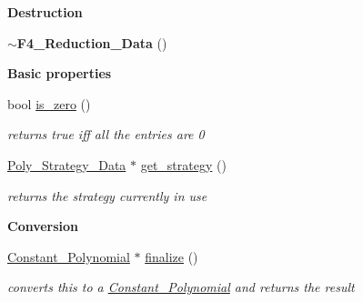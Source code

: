 \begin{Indent}\textbf{ Destruction}\par
\begin{DoxyCompactItemize}
\item 
\mbox{\label{class_f4___reduction___data_a6806b4da4f0bc2753ba5a775794f9165}} 
{\bfseries $\sim$\+F4\+\_\+\+Reduction\+\_\+\+Data} ()
\end{DoxyCompactItemize}
\end{Indent}
\begin{Indent}\textbf{ Basic properties}\par
\begin{DoxyCompactItemize}
\item 
\mbox{\label{class_f4___reduction___data_aee8c1358071a26e60b2e50f9678dcfb0}} 
bool \hyperlink{class_f4___reduction___data_aee8c1358071a26e60b2e50f9678dcfb0}{is\+\_\+zero} ()
\begin{DoxyCompactList}\small\item\em returns {\ttfamily true} iff all the entries are 0 \end{DoxyCompactList}\item 
\mbox{\label{class_f4___reduction___data_ab144b6e1a710fc979d906a8938cae7cf}} 
\hyperlink{class_poly___strategy___data}{Poly\+\_\+\+Strategy\+\_\+\+Data} $\ast$ \hyperlink{class_f4___reduction___data_ab144b6e1a710fc979d906a8938cae7cf}{get\+\_\+strategy} ()
\begin{DoxyCompactList}\small\item\em returns the strategy currently in use \end{DoxyCompactList}\end{DoxyCompactItemize}
\end{Indent}
\begin{Indent}\textbf{ Conversion}\par
\begin{DoxyCompactItemize}
\item 
\mbox{\label{class_f4___reduction___data_a37d6e0b6a1c80ad270cb273496b2dcae}} 
\hyperlink{class_constant___polynomial}{Constant\+\_\+\+Polynomial} $\ast$ \hyperlink{class_f4___reduction___data_a37d6e0b6a1c80ad270cb273496b2dcae}{finalize} ()
\begin{DoxyCompactList}\small\item\em converts {\ttfamily this} to a \hyperlink{class_constant___polynomial}{Constant\+\_\+\+Polynomial} and returns the result \end{DoxyCompactList}\end{DoxyCompactItemize}
\end{Indent}
